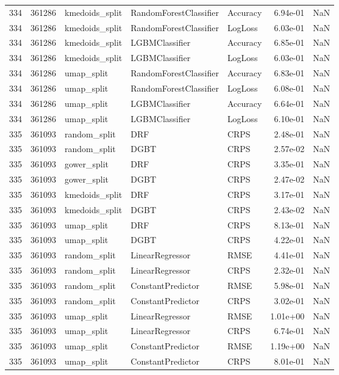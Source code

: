 \begin{tabular}{rrlllrr}
334 & 361286 & kmedoids\_split & RandomForestClassifier & Accuracy & 6.94e-01 & NaN \\
334 & 361286 & kmedoids\_split & RandomForestClassifier & LogLoss & 6.03e-01 & NaN \\
334 & 361286 & kmedoids\_split & LGBMClassifier & Accuracy & 6.85e-01 & NaN \\
334 & 361286 & kmedoids\_split & LGBMClassifier & LogLoss & 6.03e-01 & NaN \\
334 & 361286 & umap\_split & RandomForestClassifier & Accuracy & 6.83e-01 & NaN \\
334 & 361286 & umap\_split & RandomForestClassifier & LogLoss & 6.08e-01 & NaN \\
334 & 361286 & umap\_split & LGBMClassifier & Accuracy & 6.64e-01 & NaN \\
334 & 361286 & umap\_split & LGBMClassifier & LogLoss & 6.10e-01 & NaN \\
335 & 361093 & random\_split & DRF & CRPS & 2.48e-01 & NaN \\
335 & 361093 & random\_split & DGBT & CRPS & 2.57e-02 & NaN \\
335 & 361093 & gower\_split & DRF & CRPS & 3.35e-01 & NaN \\
335 & 361093 & gower\_split & DGBT & CRPS & 2.47e-02 & NaN \\
335 & 361093 & kmedoids\_split & DRF & CRPS & 3.17e-01 & NaN \\
335 & 361093 & kmedoids\_split & DGBT & CRPS & 2.43e-02 & NaN \\
335 & 361093 & umap\_split & DRF & CRPS & 8.13e-01 & NaN \\
335 & 361093 & umap\_split & DGBT & CRPS & 4.22e-01 & NaN \\
335 & 361093 & random\_split & LinearRegressor & RMSE & 4.41e-01 & NaN \\
335 & 361093 & random\_split & LinearRegressor & CRPS & 2.32e-01 & NaN \\
335 & 361093 & random\_split & ConstantPredictor & RMSE & 5.98e-01 & NaN \\
335 & 361093 & random\_split & ConstantPredictor & CRPS & 3.02e-01 & NaN \\
335 & 361093 & umap\_split & LinearRegressor & RMSE & 1.01e+00 & NaN \\
335 & 361093 & umap\_split & LinearRegressor & CRPS & 6.74e-01 & NaN \\
335 & 361093 & umap\_split & ConstantPredictor & RMSE & 1.19e+00 & NaN \\
335 & 361093 & umap\_split & ConstantPredictor & CRPS & 8.01e-01 & NaN \\

\end{tabular}
